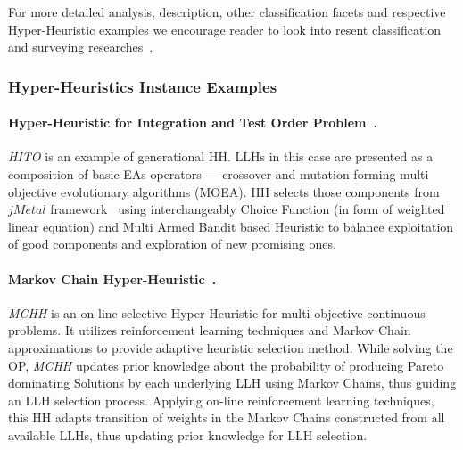 
	


For more detailed analysis, description, other classification facets and respective Hyper-Heuristic examples we encourage reader to look into resent classification and surveying researches~\cite{burke2003hyper,ryser2014review,drake2019recent,burke2019classification}.

\subsubsection{Hyper-Heuristics Instance Examples}\label{bg: hh examples}
\paragraph{Hyper-Heuristic for Integration and Test Order Problem~\cite{guizzo2015hyper}.} \textit{HITO} is an example of generational HH. LLHs in this case are presented as a composition of basic EAs operators — crossover and mutation forming multi objective evolutionary algorithms (MOEA). HH selects those components from $jMetal$ framework~\cite{durillo2011jmetal} using interchangeably Choice Function (in form of weighted linear equation) and Multi Armed Bandit based Heuristic to balance exploitation of good components and exploration of new promising ones.


\paragraph{Markov Chain Hyper-Heuristic~\cite{mcclymont2011markov}.} \textit{MCHH} is an on-line selective Hyper-Heuristic for multi-objective continuous problems. It utilizes reinforcement learning techniques and Markov Chain approximations to provide adaptive heuristic selection method. While solving the OP, \textit{MCHH} updates prior knowledge about the probability of producing Pareto dominating Solutions by each underlying LLH using Markov Chains, thus guiding an LLH selection process. Applying on-line reinforcement learning techniques, this HH adapts transition of weights in the Markov Chains constructed from all available LLHs, thus updating prior knowledge for LLH selection.


